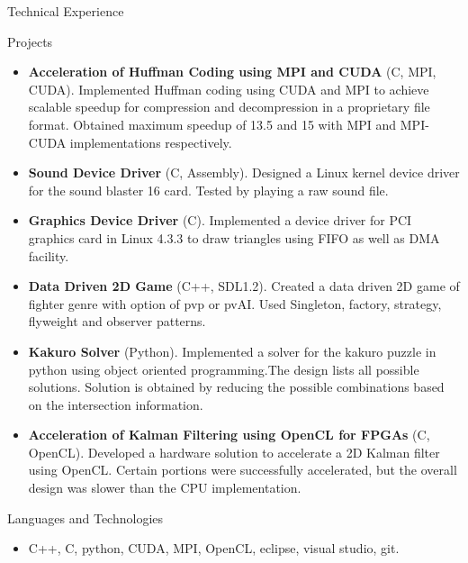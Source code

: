 \documentclass[]{SriramMadhivanan}
\begin{document}
	\begin{cvsection}{Technical Experience}
		\begin{cvsubsection}{Projects}{}{}
			\begin{itemize}
				\item \textbf{Acceleration of Huffman Coding using MPI and CUDA} (C, MPI, CUDA). Implemented Huffman coding using CUDA and MPI to achieve scalable speedup for compression and decompression in a proprietary file format. Obtained maximum speedup of 13.5 and 15 with MPI and MPI-CUDA implementations respectively.
				\item \textbf{Sound Device Driver} (C, Assembly). Designed a Linux kernel device driver for the sound blaster 16 card. Tested by playing a raw sound file.
				\item \textbf{Graphics Device Driver} (C).  Implemented a device driver for PCI graphics card in Linux 4.3.3 to draw triangles using FIFO as well as DMA facility.
				\item \textbf{Data Driven 2D Game} (C++, SDL1.2).  Created a data driven 2D game of fighter genre with option of pvp or pvAI. Used Singleton, factory, strategy, flyweight and observer patterns.
				\item \textbf{Kakuro Solver} (Python). Implemented a solver for the kakuro puzzle in python using object oriented programming.The design lists all possible solutions. Solution is obtained by reducing the possible combinations based on the intersection information.
				\item \textbf{Acceleration of Kalman Filtering using OpenCL for FPGAs} (C, OpenCL). Developed a hardware solution to accelerate a 2D Kalman filter using OpenCL. Certain portions were successfully accelerated, but the overall design was slower than the CPU implementation. 
			\end{itemize}
		\end{cvsubsection}
	\end{cvsection}
	
	\begin{cvsection}{Languages and Technologies}
		\begin{cvsubsection}{}{}{}	
			\begin{itemize}
				\item C++, C, python, CUDA, MPI, OpenCL, eclipse, visual studio, git.
			\end{itemize}
		\end{cvsubsection}
	\end{cvsection}
\end{document}
